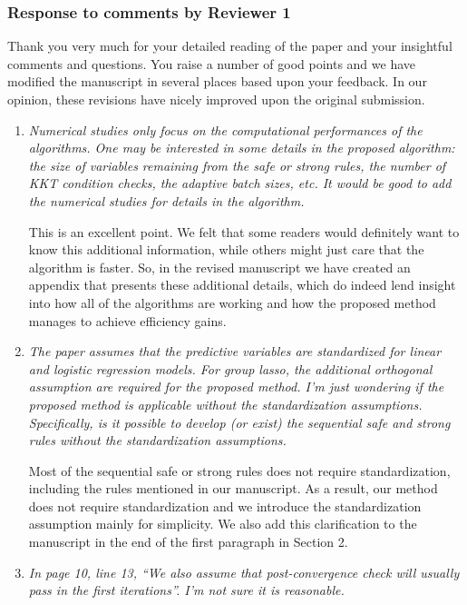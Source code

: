 \documentclass{article}
\begin{document}
\subsubsection*{Response to comments by Reviewer 1}

Thank you very much for your detailed reading of the paper and your insightful comments and questions. You raise a number of good points and we have modified the manuscript in several places based upon your feedback.  In our opinion, these revisions have nicely improved upon the original submission.

\begin{enumerate}

\item \emph{Numerical studies only focus on the computational performances of the algorithms. One may be interested in some details in the proposed algorithm: the size of variables remaining from the safe or strong rules, the number of KKT condition checks, the adaptive batch sizes, etc. It would be good to add the numerical studies for details in the algorithm.}

  This is an excellent point. We felt that some readers would definitely want to know this additional information, while others might just care that the algorithm is faster. So, in the revised manuscript we have created an appendix that presents these additional details, which do indeed lend insight into how all of the algorithms are working and how the proposed method manages to achieve efficiency gains.

\item \emph{The paper assumes that the predictive variables are standardized for linear and logistic regression models. For group lasso, the additional orthogonal assumption are required for the proposed method. I’m just wondering if the proposed method is applicable without the standardization assumptions. Specifically, is it possible to develop (or exist) the sequential safe and strong rules without the standardization assumptions.}

    Most of the sequential safe or strong rules does not require standardization, including the rules mentioned in our manuscript. As a result, our method does not require standardization and we introduce the standardization assumption mainly for simplicity. We also add this clarification to the manuscript in the end of the first paragraph in Section 2.

\item \emph{In page 10, line 13, ``We also assume that post-convergence check will usually pass in the first iterations''. I’m not sure it is reasonable.}


\end{enumerate}
\end{document}
